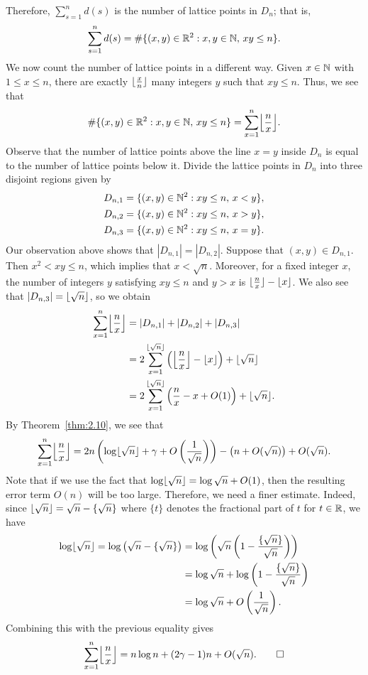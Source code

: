 \begin{pf}
Therefore, $\sum_{s=1}^n d(s)$ is the number of lattice points in $D_n$; that is, 
\[ \sum_{s=1}^n d(s) = \#\{(x, y) \in \mathbb{R}^2 : x, y \in \mathbb{N},\, xy \leq n\}. \]
We now count the number of lattice points in a different way. Given $x \in \mathbb{N}$ with $1 \leq x \leq n$, 
there are exactly $\lfloor\frac xn\rfloor$ many integers $y$ such that $xy \leq n$. Thus, we see that 
\[ \#\{(x, y) \in \R^2 : x, y \in \N,\, xy \leq n\} = \sum_{x=1}^n \floor*{\frac nx}. \]
Observe that the number of lattice points above the line $x = y$ inside $D_n$ is equal to the number of 
lattice points below it. Divide the lattice points in $D_n$ into three disjoint regions given by 
\begin{align*}
    D_{n,1} &= \{(x, y) \in \mathbb{N}^2 : xy \leq n,\, x < y\}, \\ 
    D_{n,2} &= \{(x, y) \in \mathbb{N}^2 : xy \leq n,\, x > y\}, \\
    D_{n,3} &= \{(x, y) \in \mathbb{N}^2 : xy \leq n,\, x = y\}.
\end{align*}
Our observation above shows that $|D_{n,1}| = |D_{n,2}|$. Suppose that $(x, y) \in D_{n,1}$. Then 
$x^2 < xy \leq n$, which implies that $x < \sqrt n$. Moreover, for a fixed integer $x$, the number of 
integers $y$ satisfying $xy \leq n$ and $y > x$ is $\lfloor\frac nx\rfloor - \lfloor x\rfloor$. We also see that 
$|D_{n,3}| = \lfloor\sqrt n\rfloor$, so we obtain 
\begin{align*}
    \sum_{x=1}^n \floor*{\frac nx} &= |D_{n,1}| + |D_{n,2}| + |D_{n,3}| \\
    &= 2 \sum_{x=1}^{\floor{\sqrt n}} \left( \floor*{\frac nx} - \floor x \right) + \floor{\sqrt n} \\
    &= 2 \sum_{x=1}^{\floor{\sqrt n}} \left( \frac nx - x + O(1) \right) + \floor{\sqrt n}. 
\end{align*}
By Theorem~\ref{thm:2.10}, we see that 
\[ \sum_{x=1}^n \floor*{\frac nx} = 2n \left( \log\floor{\sqrt n} + \gamma + O\left( \frac1{\sqrt n} \right) \right) - \left( n + O(\sqrt n) \right) + O(\sqrt n). \]
Note that if we use the fact that $\log\lfloor\sqrt n\rfloor = \log \sqrt n + O(1)$, then the resulting 
error term $O(n)$ will be too large. Therefore, we need a finer estimate. Indeed, since 
$\lfloor\sqrt n\rfloor = \sqrt n - \{\sqrt n\}$ where $\{t\}$ denotes the fractional part of $t$ for 
$t \in \mathbb{R}$, we have 
\begin{align*} \log \lfloor\sqrt n\rfloor = \log \left( \sqrt n - \{\sqrt n\} \right) 
&= \log \left( \sqrt n \left( 1 - \frac{\{\sqrt n\}}{\sqrt n} \right) \right) \\
&= \log \sqrt n + \log \left( 1 - \frac{\{\sqrt n\}}{\sqrt n} \right) \\
&= \log \sqrt n + O\left( \frac1{\sqrt n} \right). \end{align*}
Combining this with the previous equality gives 
\[ \sum_{x=1}^n \floor*{\frac nx} = n\log n + (2\gamma - 1)n + O(\sqrt n). \qedhere \]
\end{pf}

